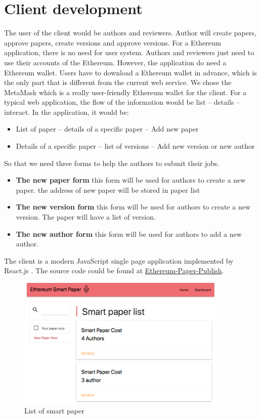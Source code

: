 \documentclass[openany,12pt]{ecsthesis}      %
\begin{document}
\section{Client development}
The user of the client would be authors and reviewers. 
Author will create papers, approve papers, create versions and approve versions. 
For a Ethereum application, there is no need for user system. 
Authors and reviewers just need to use their accounts of the Ethereum. 
However, the application do need a Ethereum wallet. Users have to download a Ethereum wallet in advance,
which is the only part that is different from the current web service.
We chose the MetaMask which is a really user-friendly Ethereum wallet for the client.
For a typical web application, the flow of the information would be list -- details -- interact. 
In the application, it would be:
\begin{itemize}
  \item List of paper -- details of a specific paper -- Add new paper
  \item Details of a specific paper -- list of versions -- Add new version or new author
\end{itemize}
So that we need three forms to help the authors to submit their jobs.
\begin{itemize}
  \item \textbf{The new paper form} this form will be used for authors to create a new paper. the address of new paper will be stored in paper list
  \item \textbf{The new version form} this form will be used for authors to create a new version. The paper will have a list of version.
  \item \textbf{The new author form} this form will be used for authors to add a new author.
\end{itemize}
The client is a modern JavaScript single page application implemented by React.js \cite{react}.
The source code could be found at \href{https://gitlab.com/yixuanxu94/Ethereum-Paper-Publish}{Ethereum-Paper-Publish}.
\begin{figure}[H]
  \centering
  \includegraphics[width=0.9\textwidth]{app1.png}
  \caption{List of smart paper}
  \label{list} 
\end{figure}
\end{document}
